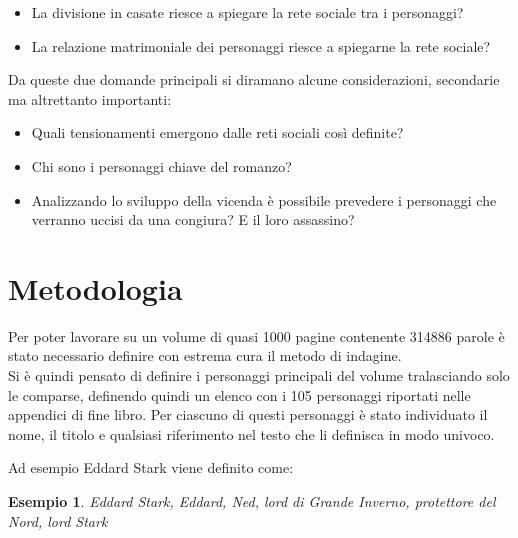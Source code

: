 \documentclass[a4paper]{article}
\begin{document}
\begin{itemize}
\item La divisione in casate riesce a spiegare la rete sociale tra i personaggi?
\item La relazione matrimoniale dei personaggi riesce a spiegarne la rete sociale?
\end{itemize}
Da queste due domande principali si diramano alcune considerazioni, secondarie ma altrettanto importanti:

\begin{itemize}
\item Quali tensionamenti emergono dalle reti sociali così definite?
\item Chi sono i personaggi chiave del romanzo?
\item Analizzando lo sviluppo della vicenda è possibile prevedere i personaggi che verranno uccisi da una congiura? E il loro assassino?
\end{itemize}

\section{Metodologia}

Per poter lavorare su un volume di quasi 1000 pagine contenente 314886 parole è stato necessario definire con estrema cura il metodo di indagine.\\
Si è quindi pensato di definire i personaggi principali del volume tralasciando solo le comparse, definendo quindi un elenco con i 105 personaggi riportati nelle appendici di fine libro. Per ciascuno di questi personaggi è stato individuato il nome, il titolo e qualsiasi riferimento nel testo che li definisca in modo univoco.\\
\newtheorem{xxx}{Esempio}
Ad esempio Eddard Stark viene definito come:
\begin{xxx}
Eddard Stark, Eddard, Ned, lord di Grande Inverno, protettore del Nord, lord Stark
\end{xxx}
\end{document}
